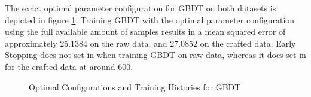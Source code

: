 The exact optimal parameter configuration for GBDT on both datasets is depicted in figure \ref{fig:GBDT_Optimal}. Training GBDT with the optimal parameter configuration using the full available amount of samples results in a mean squared error of approximately 25.1384 on the raw data, and 27.0852 on the crafted data. Early Stopping does not set in when training GBDT on raw data, whereas it does set in for the crafted data at around 600. 
\begin{figure}[h]
	\centering
	\caption{Optimal Configurations and Training Histories for GBDT}
	\label{fig:GBDT_Optimal}
\end{figure}

